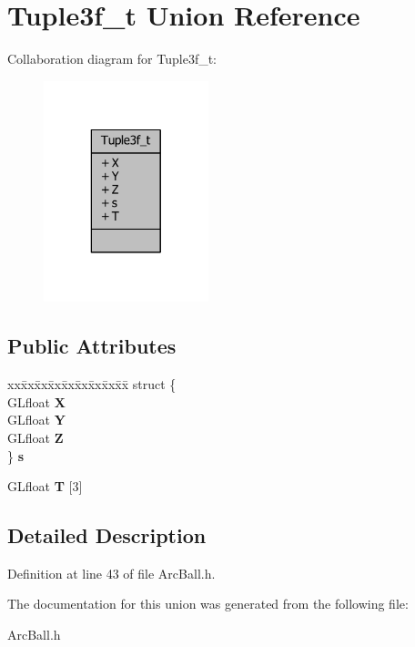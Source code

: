 \section{Tuple3f\-\_\-t Union Reference}
\label{unionTuple3f__t}


Collaboration diagram for Tuple3f\-\_\-t\-:
\nopagebreak
\begin{figure}[H]
\begin{center}
\leavevmode
\includegraphics[width=136pt]{d6/d56/unionTuple3f__t__coll__graph}
\end{center}
\end{figure}
\subsection*{Public Attributes}
\begin{DoxyCompactItemize}
\item 
\begin{tabbing}
xx\=xx\=xx\=xx\=xx\=xx\=xx\=xx\=xx\=\kill
struct \{\\
\>GLfloat {\bfseries X}\\
\>GLfloat {\bfseries Y}\\
\>GLfloat {\bfseries Z}\\
\} {\bfseries s}\label{unionTuple3f__t_add176e6d21107c3676e30c45a2cc0f35}
\\

\end{tabbing}\item 
G\-Lfloat {\bfseries T} [3]\label{unionTuple3f__t_ade1eb698eb322db20a7716dc7ce0e56a}

\end{DoxyCompactItemize}


\subsection{Detailed Description}


Definition at line 43 of file Arc\-Ball.\-h.



The documentation for this union was generated from the following file\-:\begin{DoxyCompactItemize}
\item 
Arc\-Ball.\-h\end{DoxyCompactItemize}
